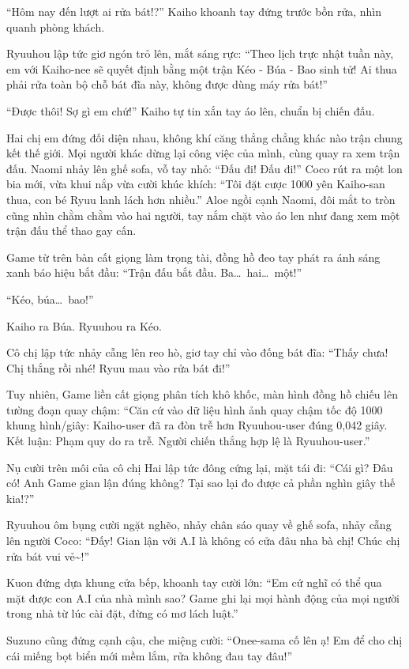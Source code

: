 ﻿\documentclass[../main.tex]{subfiles}
\begin{document}
``Hôm nay đến lượt ai rửa bát!?'' Kaiho khoanh tay đứng trước bồn rửa, nhìn quanh phòng khách.

Ryuuhou lập tức giơ ngón trỏ lên, mắt sáng rực: ``Theo lịch trực nhật tuần này, em với Kaiho-nee sẽ quyết định bằng một trận Kéo - Búa - Bao sinh tử! Ai thua phải rửa toàn bộ chỗ bát đĩa này, không được dùng máy rửa bát!''

``Được thôi! Sợ gì em chứ!'' Kaiho tự tin xắn tay áo lên, chuẩn bị chiến đấu.

Hai chị em đứng đối diện nhau, không khí căng thẳng chẳng khác nào trận chung kết thế giới. Mọi người khác dừng lại công việc của mình, cùng quay ra xem trận đấu. Naomi nhảy lên ghế sofa, vỗ tay nhỏ: ``Đấu đi! Đấu đi!'' Coco rút ra một lon bia mới, vừa khui nắp vừa cười khúc khích: ``Tôi đặt cược 1000 yên Kaiho-san thua, con bé Ryuu lanh lách hơn nhiều.'' Aloe ngồi cạnh Naomi, đôi mắt to tròn cũng nhìn chằm chằm vào hai người, tay nắm chặt vào áo len như đang xem một trận đấu thể thao gay cấn.

Game từ trên bàn cất giọng làm trọng tài, đồng hồ đeo tay phát ra ánh sáng xanh báo hiệu bắt đầu: ``Trận đấu bắt đầu. Ba\dots\ hai\dots\ một!''

``Kéo, búa\dots\ bao!''

Kaiho ra Búa. Ryuuhou ra Kéo.

Cô chị lập tức nhảy cẫng lên reo hò, giơ tay chỉ vào đống bát đĩa: ``Thấy chưa! Chị thắng rồi nhé! Ryuu mau vào rửa bát đi!''

Tuy nhiên, Game liền cất giọng phân tích khô khốc, màn hình đồng hồ chiếu lên tường đoạn quay chậm: ``Căn cứ vào dữ liệu hình ảnh quay chậm tốc độ 1000 khung hình/giây: Kaiho-user đã ra đòn trễ hơn Ryuuhou-user đúng 0,042 giây. Kết luận: Phạm quy do ra trễ. Người chiến thắng hợp lệ là Ryuuhou-user.''

Nụ cười trên môi của cô chị Hai lập tức đông cứng lại, mặt tái đi: ``Cái gì? Đâu có! Anh Game gian lận đúng không? Tại sao lại đo được cả phần nghìn giây thế kia!?''

Ryuuhou ôm bụng cười ngặt nghẽo, nhảy chân sáo quay về ghế sofa, nhảy cẫng lên người Coco: ``Đấy! Gian lận với A.I là không có cửa đâu nha bà chị! Chúc chị rửa bát vui vẻ\~{}!''

Kuon đứng dựa khung cửa bếp, khoanh tay cười lớn: ``Em cứ nghĩ có thể qua mặt được con A.I của nhà mình sao? Game ghi lại mọi hành động của mọi người trong nhà từ lúc cài đặt, đừng có mơ lách luật.''

Suzuno cũng đứng cạnh cậu, che miệng cười: ``Onee-sama cố lên ạ! Em để cho chị cái miếng bọt biển mới mềm lắm, rửa không đau tay đâu!''
\end{document}

